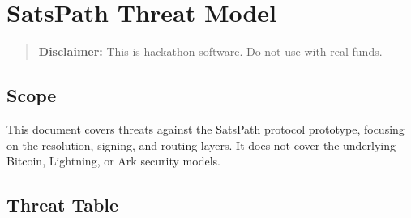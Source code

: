 \documentclass[
]{article}
\author{}
\date{}
\begin{document}
\hypertarget{satspath-threat-model}{%
\section{SatsPath Threat Model}\label{satspath-threat-model}}

\begin{quote}
\textbf{Disclaimer:} This is hackathon software. Do not use with real
funds.
\end{quote}

\hypertarget{scope}{%
\subsection{Scope}\label{scope}}

This document covers threats against the SatsPath protocol prototype,
focusing on the resolution, signing, and routing layers. It does not
cover the underlying Bitcoin, Lightning, or Ark security models.

\hypertarget{threat-table}{%
\subsection{Threat Table}\label{threat-table}}
\end{document}
